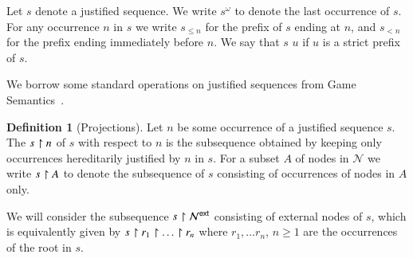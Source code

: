 \documentclass{elsarticle}
\theoremstyle{plain}
\theoremstyle{definition}
\newtheorem{definition}{Definition}[section]
\theoremstyle{remark}
\newcommand\Nodes{\mathcal{N}}%
\newcommand{\ExternalNodes}{\Nodes^{\sf ext}}
\begin{document}
Let $s$ denote a justified sequence.
We write $s^\omega$ to denote the last occurrence of $s$. For any occurrence $n$ in $s$ we write $s_{\leq n}$ for the prefix of $s$ ending at $n$, and $s_{<n}$ for the prefix ending immediately before $n$.
We say that $s$  $u$ if $u$ is a strict prefix of $s$.

We borrow some standard operations on justified sequences from Game Semantics~\cite{Abr02}.
\begin{definition}[Projections]
Let $n$ be some occurrence of a justified sequence $s$. The  $s\upharpoonright n$ of $s$ with respect to $n$ is the subsequence obtained by keeping only occurrences hereditarily justified by $n$ in $s$. For a subset $A$ of nodes in $\Nodes$ we write $s \upharpoonright A$ to denote the subsequence of $s$ consisting of occurrences of nodes in $A$ only.

We will consider the subsequence $s\filter\ExternalNodes$ consisting of external nodes of $s$, which is equivalently given by $s\upharpoonright r_1 \upharpoonright \ldots \upharpoonright r_n$ where $r_1, \ldots r_n$, $n\geq 1$ are the occurrences of the root in $s$.
\end{definition}
\end{document}
